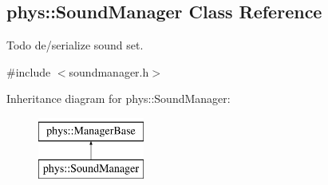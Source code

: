 \hypertarget{classphys_1_1SoundManager}{
\subsection{phys::SoundManager Class Reference}
\label{d1/dc4/classphys_1_1SoundManager}
}


Todo de/serialize sound set.  




{\ttfamily \#include $<$soundmanager.h$>$}

Inheritance diagram for phys::SoundManager:\begin{figure}[H]
\begin{center}
\leavevmode
\includegraphics[height=2.000000cm]{d1/dc4/classphys_1_1SoundManager}
\end{center}
\end{figure}
